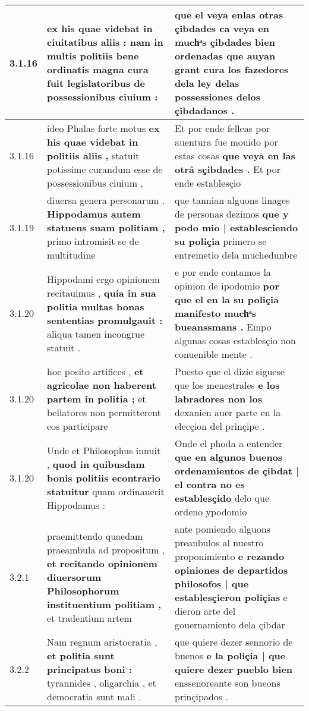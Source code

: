 \begin{tabular}{|p{1cm}|p{6.5cm}|p{6.5cm}|}
3.1.16 & ex his quae videbat in ciuitatibus aliis : \textbf{ nam in multis politiis bene ordinatis } magna cura fuit legislatoribus de possessionibus ciuium : & que el veya enlas otras çibdades \textbf{ ca veya en muchͣs çibdades bien ordenadas } que auyan grant cura los fazedores dela ley delas possessiones delos çibdadanos . \\\hline
3.1.16 & ideo Phalas forte motus \textbf{ ex his quae videbat in politiis aliis , } statuit potissime curandum esse de possessionibus ciuium , & Et por ende felleas por auentura fue mouido por estas cosas \textbf{ que veya en las otrå sçibdades . } Et por ende establesçio \\\hline
3.1.19 & diuersa genera personarum . \textbf{ Hippodamus autem statuens suam politiam , } primo intromisit se de multitudine & que tannian alguons linages de personas dezimos \textbf{ que y podo mio | establesciendo su poliçia } primero se entremetio dela muchedunbre \\\hline
3.1.20 & Hippodami ergo opinionem recitauimus , \textbf{ quia in sua politia multas bonas sententias promulgauit : } aliqua tamen incongrue statuit . & e por ende contamos la opinion de ipodomio \textbf{ por que el en la su poliçia manifesto muchͣs bueanssmans . } Empo algunas cosas establesçio non conuenible mente . \\\hline
3.1.20 & hoc posito artifices , \textbf{ et agricolae non haberent partem in politia ; } et bellatores non permitterent eos participare & Puesto que el dizie siguese que los menestrales \textbf{ e los labradores non los } dexanien auer parte en la elecçion del prinçipe . \\\hline
3.1.20 & Unde et Philosophus innuit , \textbf{ quod in quibusdam bonis politiis econtrario statuitur } quam ordinauerit Hippodamus : & Onde el phoda a entender \textbf{ que en algunos buenos ordenamientos de çibdat | el contra no es establesçido } delo que ordeno ypodomio \\\hline
3.2.1 & praemittendo quaedam praeambula ad propositum , \textbf{ et recitando opinionem diuersorum Philosophorum instituentium politiam , } et tradentium artem & ante pomiendo alguons preanbulos al nuestro proponimiento \textbf{ e rezando opiniones de departidos philosofos | que establesçieron poliçias } e dieron arte del gouernamiento dela çibdar \\\hline
3.2.2 & Nam regnum aristocratia , \textbf{ et politia sunt principatus boni : } tyrannides , oligarchia , et democratia sunt mali . & que quiere dezer sennorio de buenos \textbf{ e la poliçia | que quiere dezer pueblo bien } enssenoreante son bueons prinçipados . \\\hline

\end{tabular}

